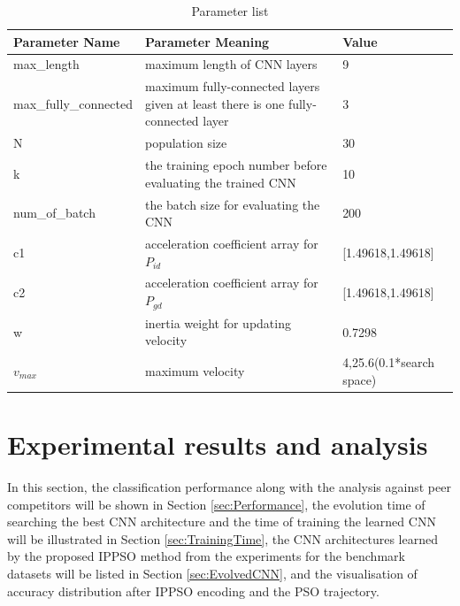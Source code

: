 \documentclass[conference]{IEEEtran}
\begin{document}
\begin{table}[!t]
	\renewcommand{\arraystretch}{1.3}
	\caption{Parameter list}
	\label{table:ParameterList}
	\centering
	\begin{tabular}{|p{2.5cm}|p{3cm}|p{2cm}|}
		\hline
		Parameter Name & Parameter Meaning & Value\\
		\hline
		max\_length & maximum length of CNN layers & 9\\
		\hline
		max\_fully\_connected & maximum fully-connected layers given at least there is one fully-connected layer & 3\\
		\hline
		N & population size & 30\\
		\hline
		k & the training epoch number before evaluating the trained CNN & 10\\
		\hline
		num\_of\_batch & the batch size for evaluating the CNN & 200\\
		\hline
		c1 & acceleration coefficient array for $P_{id}$ & [1.49618,1.49618]\\
		\hline
		c2 & acceleration coefficient array for $P_{gd}$ & [1.49618,1.49618]\\
		\hline
		w & inertia weight for updating velocity & 0.7298\\
		\hline
		$v_{max}$ & maximum velocity & 4,25.6(0.1*search space)\\
		\hline
	\end{tabular}
\end{table}

\section{Experimental results and analysis}\label{sec:EPResults}

In this section, the classification performance along with the analysis against peer competitors will be shown in Section \ref{sec:Performance}, the evolution time of searching the best CNN architecture and the time of training the learned CNN will be illustrated in Section \ref{sec:TrainingTime}, the CNN architectures learned by the proposed IPPSO method from the experiments for the benchmark datasets will be listed in Section \ref{sec:EvolvedCNN}, and the visualisation of accuracy distribution after IPPSO encoding and the PSO trajectory. 
\end{document}
